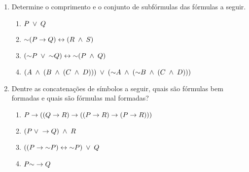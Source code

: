 \begin{enumerate}
  \item Determine o comprimento e o conjunto de subfórmulas das fórmulas a seguir.
    \begin{enumerate}
      \item $P \;\lor\; Q$
      \item $\mathord{\sim} ( P \rightarrow Q ) \leftrightarrow ( R \;\land\; S)$
      \item $ (\mathord{\sim} P \;\lor\; \mathord{\sim} Q) \leftrightarrow \mathord{\sim} ( P \;\land\; Q )$
      \item $ ( A \;\land\; ( B \;\land\; ( C \;\land\; D ) ) ) \;\lor\; ( \mathord{\sim} A \;\land\; ( \mathord{\sim} B \;\land\; ( C \;\land\; D ) ) )$
    \end{enumerate}

  \item Dentre as concatenações de símbolos a seguir, quais são fórmulas bem formadas e quais são fórmulas mal formadas?
    \begin{enumerate}
      \item $ P \rightarrow ( ( Q \rightarrow R ) \rightarrow ( ( P \rightarrow R ) \rightarrow ( P \rightarrow R ) ) )$
      \item $ (P \;\lor\; \rightarrow Q) \;\land\; R$
      \item $ ( ( P \rightarrow \mathord{\sim} P ) \leftrightarrow \mathord{\sim} P ) \;\lor\; Q$
      \item $ P \mathord{\sim} \rightarrow Q$
    \end{enumerate}


\end{enumerate}
